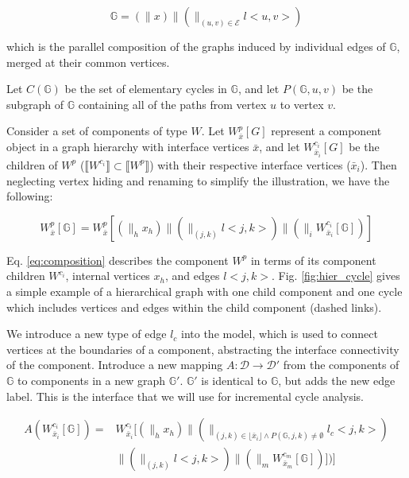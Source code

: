 \begin{equation}
\mathbb{G} = (\parallel x) \parallel (\parallel_{(u,v) \in \mathcal{E}} l < u, v >)
\end{equation}

which is the parallel composition of the graphs induced by individual edges of $\mathbb{G}$, merged at their common vertices.

Let $C(\mathbb{G})$ be the set of elementary cycles in $\mathbb{G}$, and 
let $P(\mathbb{G}, u, v)$ be the subgraph of $\mathbb{G}$ containing all of
the paths from vertex $u$ to vertex $v$.

Consider a set of components of type $W$.  Let $W_{\bar{x}}^p [G]$ 
represent a component object in a graph hierarchy with interface
vertices $\bar{x}$, and let $W_{\bar{x}_i}^{c_i} [G]$ be the children
of $W^p$ ($\llbracket W^{c_i} \rrbracket \subset \llbracket W^p \rrbracket$) with their respective interface vertices ($\bar{x}_i$).  Then neglecting vertex hiding and renaming to simplify the illustration, we have the following:

\begin{equation}
W_{\bar{x}}^p [\mathbb{G}] = W_{\bar{x}}^p [ (\parallel_{h} x_h) \parallel
(\parallel_{(j,k)} l< j,k >) \parallel (\parallel_{i} W_{\bar{x}_i}^{c_i} 
[\mathbb{G}]) ]
\label{eq:composition}
\end{equation}

Eq. \ref{eq:composition} describes the component $W^p$ in terms of its component 
children $W^{c_i}$, internal vertices $x_h$, and edges $l <j,k>$.   Fig. \ref{fig:hier_cycle} gives a simple example of a hierarchical graph with one child component and one cycle which includes vertices and edges within the child component (dashed links).

We introduce a new type of edge $l_c$ into the model,  
which is used to connect vertices at the boundaries of a component, 
abstracting the interface connectivity of the component. Introduce 
a new mapping $A: \mathcal{D} \rightarrow \mathcal{D}'$ from the 
components of $\mathbb{G}$ to components in a new graph $\mathbb{G}'$.  
$\mathbb{G}'$ is identical to $\mathbb{G}$, but adds the new edge
label.  This is the interface that we will use for incremental cycle
analysis.

\begin{align}
A( W_{\bar{x}_i}^{c_i} [\mathbb{G}] ) = & W_{\bar{x}_i}^{c_i} 
[ (\parallel_h x_h) \parallel 
(\parallel_{(j,k) \in \lfloor \bar{x}_i \rfloor \wedge P(\mathbb{G},j,k) 
\neq \emptyset} l_c <j,k>) \\
 & \parallel (\parallel_{(j,k)} l<j,k> )
\parallel (\parallel_m W_{\bar{x}_m}^{c_m} [\mathbb{G}]) ]) ] \nonumber
\end{align}

